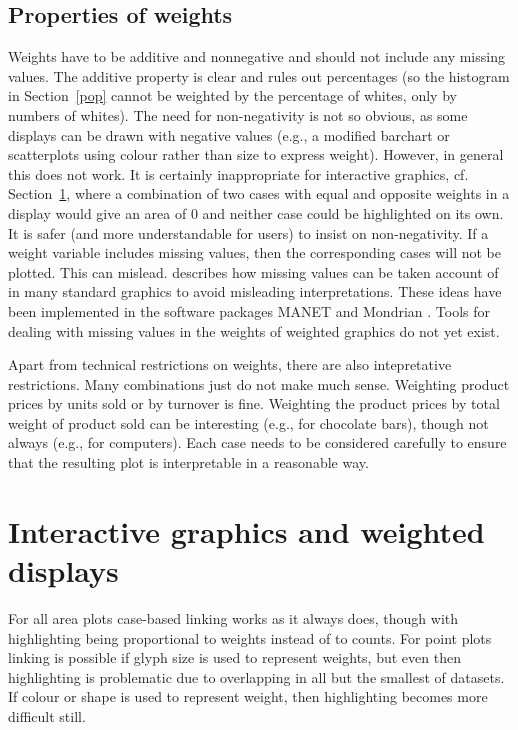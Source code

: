 \documentclass{svmult}
\begin{document}
\subsection{Properties of weights}
\label{props}
Weights have to be additive and nonnegative and should not include any missing values.  The additive property is clear and rules out percentages (so the histogram in Section~\ref{pop} cannot be weighted by the percentage of whites, only by numbers of whites).  The need for non-negativity is not so obvious, as some displays can be drawn with negative values (e.g., a modified barchart or scatterplots using colour rather than size to express weight).  However, in general this does not work.  It is certainly inappropriate for interactive graphics, cf. Section~\ref{ig}, where a combination of two cases with equal and opposite weights in a display would give an area of $0$ and neither case could be highlighted on its own.  It is safer (and more understandable for users) to insist on non-negativity.  If a weight variable includes missing values, then the corresponding cases will not be plotted.  This can mislead.  \cite{unwin:1996} describes how missing values can be taken account of in many standard graphics to avoid misleading interpretations.  These ideas have been implemented in the software packages MANET \citep{hofmann:2000a} and Mondrian \citep{theus:2002}.  Tools for dealing with missing values in the weights of weighted graphics do not yet exist.

Apart from technical restrictions on weights, there are also intepretative restrictions.  Many combinations just do not make much sense.   Weighting product prices by units sold or by turnover is fine.  Weighting the product prices by total weight of product sold can be interesting (e.g., for chocolate bars), though not always (e.g., for computers).  Each case needs to be considered carefully to ensure that the resulting plot is interpretable in a reasonable way.

\section{Interactive graphics and weighted displays}
\label{ig}
For all area plots case-based linking works as it always does, though with highlighting being proportional to weights instead of to counts.  For point plots linking is possible if glyph size is used to represent weights, but even then highlighting is problematic due to overlapping in all but the smallest of datasets.  If colour or shape is used to represent weight, then highlighting becomes more difficult still.
\end{document}
